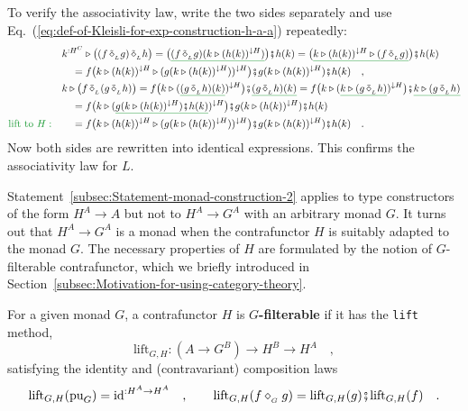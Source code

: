 To verify the associativity law, write the two sides separately and
use Eq.~(\ref{eq:def-of-Kleisli-for-exp-construction-h-a-a}) repeatedly:
\begin{align*}
 & k^{:H^{C}}\triangleright\big((f\,\tilde{\diamond}_{_{L}}g)\,\tilde{\diamond}_{_{L}}h\big)=\big(\gunderline{(f\,\tilde{\diamond}_{_{L}}g)(k\triangleright(h(k))^{\downarrow H})}\big)\bef h(k)=\big(\gunderline{k\triangleright(h(k))^{\downarrow H}\triangleright(f\,\tilde{\diamond}_{_{L}}g)}\big)\bef h(k)\\
 & \quad=f\big(k\triangleright(h(k))^{\downarrow H}\triangleright(g(k\triangleright(h(k))^{\downarrow H}))^{\downarrow H}\big)\bef g(k\triangleright(h(k))^{\downarrow H})\bef h(k)\quad,\\
 & k\triangleright\big(f\,\tilde{\diamond}_{_{L}}(g\,\tilde{\diamond}_{_{L}}h)\big)=f\big(k\triangleright(\gunderline{(g\,\tilde{\diamond}_{_{L}}h)(k)})^{\downarrow H}\big)\bef\gunderline{(g\,\tilde{\diamond}_{_{L}}h)(k)}=f\big(k\triangleright(\gunderline{k\triangleright(g\,\tilde{\diamond}_{_{L}}h)})^{\downarrow H}\big)\bef\gunderline{k\triangleright(g\,\tilde{\diamond}_{_{L}}h)}\\
 & \quad=f\big(k\triangleright(\gunderline{g(k\triangleright(h(k))^{\downarrow H})\bef h(k)})^{\downarrow H}\big)\bef g(k\triangleright(h(k))^{\downarrow H})\bef h(k)\\
{\color{greenunder}\text{lift to }H:}\quad & \quad=f\big(k\triangleright(h(k))^{\downarrow H}\triangleright(g(k\triangleright(h(k))^{\downarrow H}))^{\downarrow H}\big)\bef g(k\triangleright(h(k))^{\downarrow H})\bef h(k)\quad.
\end{align*}
Now both sides are rewritten into identical expressions. This confirms
the associativity law for $L$.

Statement~\ref{subsec:Statement-monad-construction-2} applies to
type constructors of the form $H^{A}\rightarrow A$ but not to $H^{A}\rightarrow G^{A}$
with an arbitrary monad $G$. It turns out that $H^{A}\rightarrow G^{A}$
is a monad when the contrafunctor $H$ is suitably adapted to the
monad $G$. The necessary properties of $H$ are formulated by the
notion of  $G$-filterable contrafunctor,
which we briefly introduced in Section~\ref{subsec:Motivation-for-using-category-theory}.

For a given monad $G$, a contrafunctor $H$ is $G$\textbf{-filterable}
if it has the \lstinline!lift! method,
\[
\text{lift}_{G,H}:(A\rightarrow G^{B})\rightarrow H^{B}\rightarrow H^{A}\quad,
\]
satisfying the identity and (contravariant) composition laws
\[
\text{lift}_{G,H}(\text{pu}_{G})=\text{id}^{:H^{A}\rightarrow H^{A}}\quad,\quad\quad\text{lift}_{G,H}(f\diamond_{_{G}}g)=\text{lift}_{G,H}(g)\bef\text{lift}_{G,H}(f)\quad.
\]

